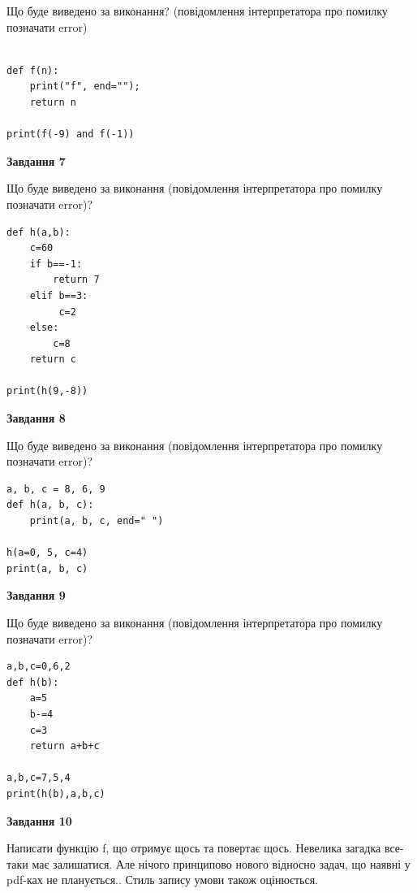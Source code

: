 \documentclass[12pt, ukrainian]{article}
\begin{document}
{\begin {large}
Що буде виведено за виконання? (повідомлення інтерпретатора про помилку позначати error)\par
\begin{verbatim}

def f(n):
    print("f", end="");
    return n

print(f(-9) and f(-1))
\end{verbatim}

{\begin {center}\textbf{Завдання 7}\end {center}}

Що буде виведено за виконання (повідомлення інтерпретатора про помилку позначати error)?\par
\begin{verbatim}
def h(a,b):
    c=60
    if b==-1:
        return 7
    elif b==3:
         c=2
    else: 
        c=8
    return c

print(h(9,-8))
\end{verbatim}

{\begin {center}\textbf{Завдання 8}\end {center}}

Що буде виведено за виконання (повідомлення інтерпретатора про помилку позначати error)?\par
\begin{verbatim}
a, b, c = 8, 6, 9
def h(a, b, c):
    print(a, b, c, end=" ")

h(a=0, 5, c=4)
print(a, b, c)
\end{verbatim}

{\begin {center}\textbf{Завдання 9}\end {center}}

Що буде виведено за виконання (повідомлення інтерпретатора про помилку позначати error)?\par
\begin{verbatim}
a,b,c=0,6,2
def h(b):
    a=5
    b-=4
    c=3
    return a+b+c

a,b,c=7,5,4
print(h(b),a,b,c)
\end{verbatim}

{\begin {center}\textbf{Завдання 10}\end {center}}


Написати функцiю f, що отримує щось та повертає щось. Невелика загадка все-таки має залишатися. Але нічого принципово нового відносно задач, що наявні у pdf-ках не планується.. Стиль запису умови також оцінюється.\par
\end {large}}
\newpage
\end{document}
